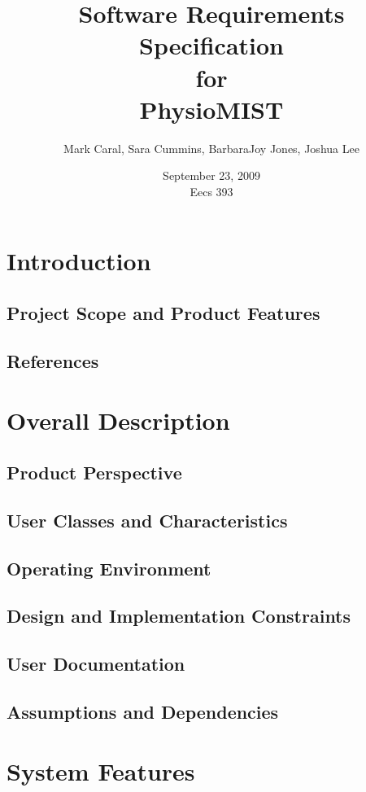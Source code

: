 \documentclass{article}
\title{Software Requirements Specification\\
\bigskip
{\large for}\\
\bigskip
PhysioMIST}
\author{Mark Caral, Sara Cummins, BarbaraJoy Jones, Joshua Lee}
\date{September 23, 2009\\{\sc Eecs} 393}
\begin{document}
\begin{titlepage}
\maketitle\thispagestyle{empty}
\end{titlepage}

\tableofcontents
\newpage

\section{Introduction}
\subsection{Project Scope and Product Features}
\subsection{References}

\section{Overall Description}
\subsection{Product Perspective}
\subsection{User Classes and Characteristics}
\subsection{Operating Environment}
\subsection{Design and Implementation Constraints}
\subsection{User Documentation}
\subsection{Assumptions and Dependencies}

\section{System Features}
\end{document}
